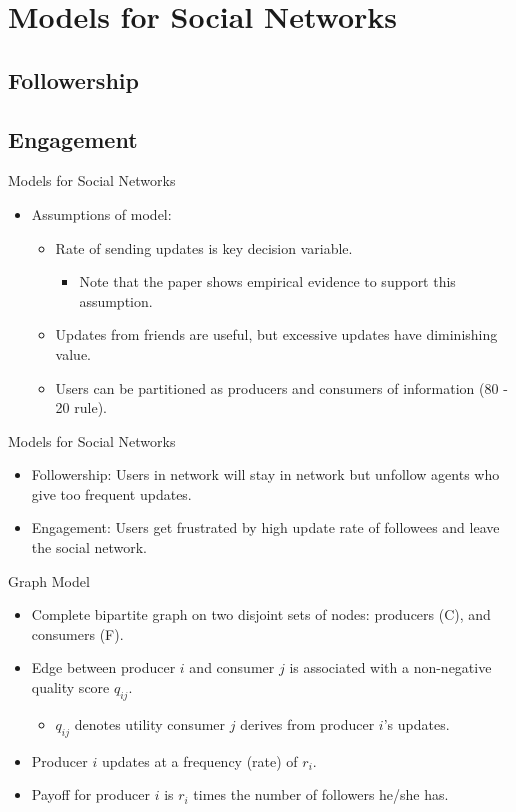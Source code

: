 \documentclass[aspectratio=169]{beamer}
\newcommand{\bi}{\begin{itemize}}
\newcommand{\ei}{\end{itemize}}
\begin{document}
\section{Models for Social Networks}
\subsection{Followership}
\subsection{Engagement}
\begin{frame}{Models for Social Networks}
    \bi
\item  Assumptions of model:
    \pause
    \bi
\item Rate of sending updates is key decision variable.
    \pause
    \bi
\item Note that the paper shows empirical evidence to support this assumption.
    \ei
    \pause
\item Updates from friends are useful, but excessive updates have diminishing
    value.
    \pause
\item Users can be partitioned as producers and consumers of information (80 -
    20 rule).
    \ei
    \ei
\end{frame}

\begin{frame}{Models for Social Networks}
    \bi
\item Followership: Users in network will stay in network but unfollow agents
    who give too frequent updates.
    \pause
\item Engagement: Users get frustrated by high update rate of followees and
    leave the social network.
    \ei
\end{frame}

\begin{frame}{Graph Model}
    \bi
\item Complete bipartite graph on two disjoint sets of nodes: producers (C), and
    consumers (F).
    \pause
\item Edge between producer $i$ and consumer $j$ is associated with a non-negative
    quality score $q_{ij}$.
    \pause
    \bi
\item $q_{ij}$ denotes utility consumer $j$ derives from producer $i$'s updates.
    \ei
    \pause
\item Producer $i$ updates at a frequency (rate) of $r_{i}$.
    \pause
\item Payoff for producer $i$ is $r_i$ times the number of followers he/she has.
    \ei
\end{frame}
\end{document}
